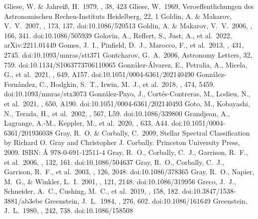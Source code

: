\documentclass[twocolumn,tighten,twocolappendix]{aastex631}
\begin{document}
\begin{thebibliography}{}
 Gliese, W. \& Jahrei{\ss}, H.\ 1979, \aaps, 38, 423
 Gliese, W.\ 1969, Veroeffentlichungen des Astronomischen Rechen-Instituts Heidelberg, 22, 1
 Goldin, A. \& Makarov, V.~V.\ 2007, \apjs, 173, 137. doi:10.1086/520513
 Goldin, A. \& Makarov, V.~V.\ 2006, \apjs, 166, 341. doi:10.1086/505939
 Golovin, A., Reffert, S., Just, A., et al.\ 2022, arXiv:2211.01449
 Gomes, J.~I., Pinfield, D.~J., Marocco, F., et al.\ 2013, \mnras, 431, 2745. doi:10.1093/mnras/stt371
 Gontcharov, G.~A.\ 2006, Astronomy Letters, 32, 759. doi:10.1134/S1063773706110065
 Gonz{\'a}lez-{\'A}lvarez, E., Petralia, A., Micela, G., et al.\ 2021, \aap, 649, A157. doi:10.1051/0004-6361/202140490
 Gonz{\'a}lez-Fern{\'a}ndez, C., Hodgkin, S.~T., Irwin, M.~J., et al.\ 2018, \mnras, 474, 5459. doi:10.1093/mnras/stx3073
 Gonz{\'a}lez-Payo, J., Cort{\'e}s-Contreras, M., Lodieu, N., et al.\ 2021, \aap, 650, A190. doi:10.1051/0004-6361/202140493
 Goto, M., Kobayashi, N., Terada, H., et al.\ 2002, \apjl, 567, L59. doi:10.1086/339800
 Grandjean, A., Lagrange, A.-M., Keppler, M., et al.\ 2020, \aap, 633, A44. doi:10.1051/0004-6361/201936038
 Gray, R.~O. \& Corbally, C.\ 2009, Stellar Spectral Classification by Richard O. Gray and Christopher J. Corbally. Princeton University Press, 2009. ISBN: {\^A} 978-0-691-12511-4
 Gray, R.~O., Corbally, C.~J., Garrison, R.~F., et al.\ 2006, \aj, 132, 161. doi:10.1086/504637
 Gray, R.~O., Corbally, C.~J., Garrison, R.~F., et al.\ 2003, \aj, 126, 2048. doi:10.1086/378365
 Gray, R.~O., Napier, M.~G., \& Winkler, L.~I.\ 2001, \aj, 121, 2148. doi:10.1086/319956
 Greco, J.~J., Schneider, A.~C., Cushing, M.~C., et al.\ 2019, \aj, 158, 182. doi:10.3847/1538-3881/ab3ebe
 Greenstein, J.~L.\ 1984, \apj, 276, 602. doi:10.1086/161649
 Greenstein, J.~L.\ 1980, \apj, 242, 738. doi:10.1086/158508

\end{thebibliography}
\end{document}

